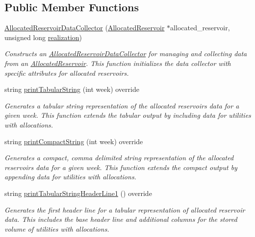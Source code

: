 \subsection*{Public Member Functions}
\begin{DoxyCompactItemize}
\item 
\mbox{\hyperlink{classAllocatedReservoirDataCollector_a512b8604164f43d08f961e0f433678e3}{Allocated\+Reservoir\+Data\+Collector}} (\mbox{\hyperlink{classAllocatedReservoir}{Allocated\+Reservoir}} $\ast$allocated\+\_\+reservoir, unsigned long \mbox{\hyperlink{classDataCollector_a9ef2887466fe3123aa19ef956a219b96}{realization}})
\begin{DoxyCompactList}\small\item\em Constructs an \mbox{\hyperlink{classAllocatedReservoirDataCollector}{Allocated\+Reservoir\+Data\+Collector}} for managing and collecting data from an \mbox{\hyperlink{classAllocatedReservoir}{Allocated\+Reservoir}}. This function initializes the data collector with specific attributes for allocated reservoirs. \end{DoxyCompactList}\item 
string \mbox{\hyperlink{classAllocatedReservoirDataCollector_ae5a9aa9b2a3cffd8f5ffe983c8fcf6c8}{print\+Tabular\+String}} (int week) override
\begin{DoxyCompactList}\small\item\em Generates a tabular string representation of the allocated reservoir\textquotesingle{}s data for a given week. This function extends the tabular output by including data for utilities with allocations. \end{DoxyCompactList}\item 
string \mbox{\hyperlink{classAllocatedReservoirDataCollector_a35f8125d428e65c737ff3360ae9bd0cd}{print\+Compact\+String}} (int week) override
\begin{DoxyCompactList}\small\item\em Generates a compact, comma delimited string representation of the allocated reservoir\textquotesingle{}s data for a given week. This function extends the compact output by appending data for utilities with allocations. \end{DoxyCompactList}\item 
string \mbox{\hyperlink{classAllocatedReservoirDataCollector_ae82c7a68af1dce9003cccc6da1800e28}{print\+Tabular\+String\+Header\+Line1}} () override
\begin{DoxyCompactList}\small\item\em Generates the first header line for a tabular representation of allocated reservoir data. This includes the base header line and additional columns for the stored volume of utilities with allocations. \end{DoxyCompactList}\item 

\end{DoxyCompactItemize}
